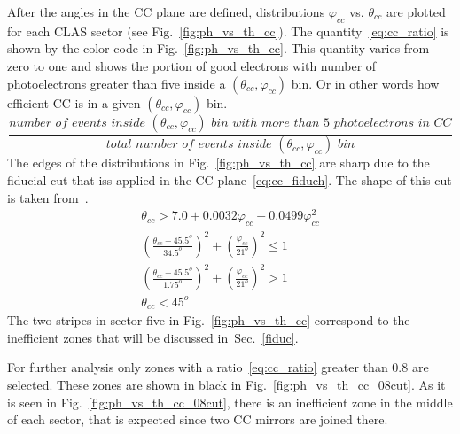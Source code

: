 After the angles in the CC plane are defined, distributions $\varphi_{cc}$ vs. $\theta_{cc}$ are plotted for each CLAS sector (see Fig.~\ref{fig:ph_vs_th_cc}).
The quantity~\ref{eq:cc_ratio} is shown by the color code in Fig.~\ref{fig:ph_vs_th_cc}. This quantity varies from zero to one and shows the portion of good electrons with number of photoelectrons greater than five inside a $(\theta_{cc},\varphi_{cc})$ bin. Or in other words how efficient CC is in a given $(\theta_{cc},\varphi_{cc})$ bin. 
\begin{equation}
\frac{number\,\, of\,\, events\,\,  inside\,\, (\theta_{cc},\varphi_{cc})\,\, bin\,\, with\,\, more\,\, than\,\, 5\,\, photoelectrons\,\, in\,\, CC}{total\,\, number\,\, of\,\, events\,\,  inside\,\, (\theta_{cc},\varphi_{cc})\,\, bin}
\label{eq:cc_ratio}
\end{equation}
The edges of the distributions in Fig.~\ref{fig:ph_vs_th_cc} are sharp due to the fiducial cut that iss applied in the CC plane~\ref{eq:cc_fiduch}. 
The shape of this cut  is taken from~\cite{Khetarpal:2010}.
\begin{equation}
\begin{aligned}
\theta_{cc} > 7.0+0.0032\varphi_{cc}+0.0499\varphi_{cc}^{2} \\
\left( \frac{\theta_{cc}-45.5^{o}}{34.5^{o}} \right)^{2} + \left( \frac{\varphi_{cc}}{21^{o}} \right)^{2} \le 1 \\
\left( \frac{\theta_{cc}-45.5^{o}}{1.75^{o}} \right)^{2} + \left( \frac{\varphi_{cc}}{21^{o}} \right)^{2} > 1 \\
\theta_{cc} < 45^{o} \, \, \,  \, \, \, \, \, \,   \, \, \,  \, \, \, \, \, \,
\label{eq:cc_fiduch}
\end{aligned}
\end{equation}
The two stripes in sector five in Fig.~\ref{fig:ph_vs_th_cc} correspond to the inefficient zones that will be discussed in~Sec.~\ref{fiduc}.

For further analysis only zones with a ratio~\ref{eq:cc_ratio} greater than $0.8$ are selected. These zones are shown in black in Fig.~\ref{fig:ph_vs_th_cc_08cut}. As it is seen in Fig.~\ref{fig:ph_vs_th_cc_08cut}, there is an inefficient zone in the middle of each sector, that is expected since two CC mirrors are joined there.

